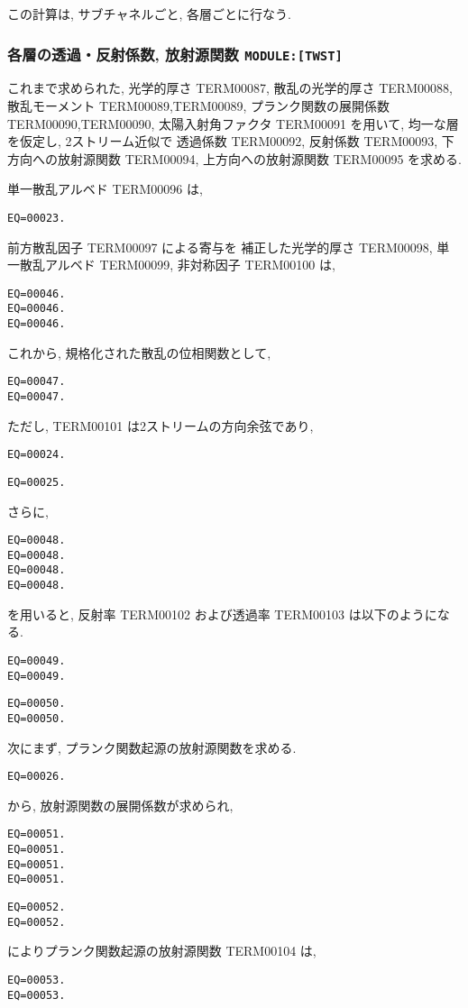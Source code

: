この計算は, サブチャネルごと, 各層ごとに行なう.

\subsubsection{各層の透過・反射係数, 放射源関数 \texttt{MODULE:[TWST]}}

これまで求められた, 光学的厚さ TERM00087, 散乱の光学的厚さ TERM00088,
散乱モーメント TERM00089,TERM00089, プランク関数の展開係数 TERM00090,TERM00090,
太陽入射角ファクタ TERM00091 を用いて,
均一な層を仮定し, 2ストリーム近似で
透過係数 TERM00092, 反射係数 TERM00093, 下方向への放射源関数 TERM00094,
上方向への放射源関数 TERM00095 を求める.

単一散乱アルベド TERM00096 は,
\begin{verbatim}
EQ=00023.
\end{verbatim}
前方散乱因子 TERM00097 による寄与を
補正した光学的厚さ TERM00098,
単一散乱アルベド TERM00099, 非対称因子 TERM00100 は,
\begin{verbatim}
EQ=00046.
EQ=00046.
EQ=00046.
\end{verbatim}

これから, 規格化された散乱の位相関数として,
\begin{verbatim}
EQ=00047.
EQ=00047.
\end{verbatim}
ただし, TERM00101 は2ストリームの方向余弦であり,
\begin{verbatim}
EQ=00024.
\end{verbatim}
\begin{verbatim}
EQ=00025.
\end{verbatim}

さらに,
\begin{verbatim}
EQ=00048.
EQ=00048.
EQ=00048.
EQ=00048.
\end{verbatim}
を用いると, 反射率 TERM00102 および透過率 TERM00103 は以下のようになる.
\begin{verbatim}
EQ=00049.
EQ=00049.
\end{verbatim}
\begin{verbatim}
EQ=00050.
EQ=00050.
\end{verbatim}

次にまず, プランク関数起源の放射源関数を求める.
\begin{verbatim}
EQ=00026.
\end{verbatim}
から, 放射源関数の展開係数が求められ,
\begin{verbatim}
EQ=00051.
EQ=00051.
EQ=00051.
EQ=00051.
\end{verbatim}
\begin{verbatim}
EQ=00052.
EQ=00052.
\end{verbatim}
によりプランク関数起源の放射源関数 TERM00104 は,
\begin{verbatim}
EQ=00053.
EQ=00053.
\end{verbatim}

